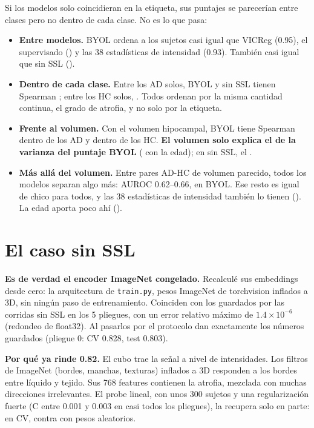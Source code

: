 \documentclass[11pt,a4paper]{article}
\begin{document}
Si los modelos solo coincidieran en la etiqueta, sus puntajes se parecerían entre clases
pero no dentro de cada clase. No es lo que pasa:
\begin{itemize}
  \item \textbf{Entre modelos.} BYOL ordena a los sujetos casi igual que VICReg (0.95),
        el supervisado (\nrhoByolSup) y las 38 estadísticas de intensidad (0.93).
        También casi igual que sin SSL (\nrhoByolInit).
  \item \textbf{Dentro de cada clase.} Entre los AD solos, BYOL y sin SSL tienen
        Spearman \nrhoByolInitAD; entre los HC solos, \nrhoByolInitHC. Todos ordenan
        por la misma cantidad continua, el grado de atrofia, y no solo por la etiqueta.
  \item \textbf{Frente al volumen.} Con el volumen hipocampal, BYOL tiene Spearman
        \nrhoByolVolAD{} dentro de los AD y \nrhoByolVolHC{} dentro de los HC.
        \textbf{El volumen solo explica el \nrTwoByol{} de la varianza del puntaje BYOL}
        (\nrTwoByolAge{} con la edad); en sin SSL, el \nrTwoInit.
  \item \textbf{Más allá del volumen.} Entre pares AD-HC de volumen parecido, todos los
        modelos separan algo más: AUROC 0.62--0.66, \ncondByol{} en BYOL. Ese resto es
        igual de chico para todos, y las 38 estadísticas de intensidad también lo tienen
        (\ncondStats). La edad aporta poco ahí (\ncondAge).
\end{itemize}

\section{El caso sin SSL}
\label{sec:sinssl}

\textbf{Es de verdad el encoder ImageNet congelado.} Recalculé sus embeddings desde cero:
la arquitectura de \texttt{train.py}, pesos ImageNet de torchvision inflados a 3D, sin
ningún paso de entrenamiento. Coinciden con los guardados por las corridas sin SSL en
los 5 pliegues, con un error relativo máximo de $1.4\times10^{-6}$ (redondeo de
float32). Al pasarlos por el protocolo dan exactamente los números guardados (pliegue 0:
CV 0.828, test 0.803).

\textbf{Por qué ya rinde 0.82.} El cubo trae la señal a nivel de intensidades. Los
filtros de ImageNet (bordes, manchas, texturas) inflados a 3D responden a los bordes
entre líquido y tejido. Sus 768 features contienen la atrofia, mezclada con muchas
direcciones irrelevantes. El probe lineal, con unos 300 sujetos y una regularización
fuerte (C entre 0.001 y 0.003 en casi todos los pliegues), la recupera solo en parte:
\ninitCV{} en CV, contra \nrandCV{} con pesos aleatorios.
\end{document}
